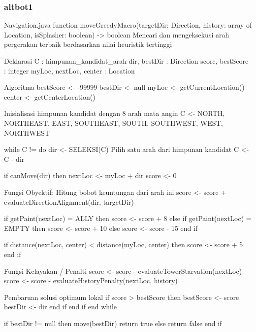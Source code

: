 \subsubsection{altbot1}
\begin{pseudocode}{Navigation.java}
    function moveGreedyMacro(targetDir: Direction, history: array of Location, isSplasher: boolean) -> boolean
    { Mencari dan mengeksekusi arah pergerakan terbaik berdasarkan nilai heuristik tertinggi }

    { Deklarasi }
    C : himpunan_kandidat_arah
    dir, bestDir : Direction
    score, bestScore : integer
    myLoc, nextLoc, center : Location

    { Algoritma }
    bestScore <- -99999
    bestDir <- null
    myLoc <- getCurrentLocation()
    center <- getCenterLocation()

    { Inisialisasi himpunan kandidat dengan 8 arah mata angin }
    C <- {NORTH, NORTHEAST, EAST, SOUTHEAST, SOUTH, SOUTHWEST, WEST, NORTHWEST}

    while C != {} do
        dir <- SELEKSI(C) { Pilih satu arah dari himpunan kandidat }
        C <- C - {dir}
        
        if canMove(dir) then
            nextLoc <- myLoc + dir
            score <- 0
            
            { Fungsi Obyektif: Hitung bobot keuntungan dari arah ini }
            score <- score + evaluateDirectionAlignment(dir, targetDir)
            
            if getPaint(nextLoc) = ALLY then
                score <- score + 8
            else if getPaint(nextLoc) = EMPTY then
                score <- score + 10
            else
                score <- score - 15
            end if
            
            if distance(nextLoc, center) < distance(myLoc, center) then
                score <- score + 5
            end if
            
            { Fungsi Kelayakan / Penalti }
            score <- score - evaluateTowerStarvation(nextLoc)
            score <- score - evaluateHistoryPenalty(nextLoc, history)
            
            { Pembaruan solusi optimum lokal }
            if score > bestScore then
                bestScore <- score
                bestDir <- dir
            end if
        end if
    end while

    if bestDir != null then
        move(bestDir)
        return true
    else
        return false
    end if
\end{pseudocode}

